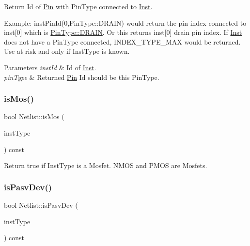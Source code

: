 Return Id of \hyperlink{classPin}{Pin} with Pin\+Type connected to \hyperlink{classInst}{Inst}. 

Example\+: inst\+Pin\+Id(0,\+Pin\+Type\+::\+D\+R\+A\+I\+N) would return the pin index connected to inst\mbox{[}0\mbox{]} which is \hyperlink{type_8h_afaab50027002ecbb6c8ac27e727d1bb4ad22e8f7ce637479aeffe9dab9ee7337d}{Pin\+Type\+::\+D\+R\+A\+IN}. Or this returns inst\mbox{[}0\mbox{]} drain pin index. If \hyperlink{classInst}{Inst} does not have a Pin\+Type connected, I\+N\+D\+E\+X\+\_\+\+T\+Y\+P\+E\+\_\+\+M\+AX would be returned. Use at risk and only if Inst\+Type is known.


\begin{DoxyParams}{Parameters}
{\em inst\+Id} & Id of \hyperlink{classInst}{Inst}. \\
\hline
{\em pin\+Type} & Returned \hyperlink{classPin}{Pin} Id should be this Pin\+Type. \\
\hline
\end{DoxyParams}
\mbox{\label{classNetlist_a3ea34258d9e7f6793736dcac5b927eb6}} 
\subsubsection{\texorpdfstring{is\+Mos()}{isMos()}}
{\footnotesize\ttfamily bool Netlist\+::is\+Mos (\begin{DoxyParamCaption}\item[{\hyperlink{type_8h_a53644c687d6bc203d9d3d3ee70075f61}{Inst\+Type}}]{inst\+Type }\end{DoxyParamCaption}) const}



Return true if Inst\+Type is a Mosfet. N\+M\+OS and P\+M\+OS are Mosfets. 

\mbox{\label{classNetlist_acb347983cc7dcfb9d40c2affe8442cb2}} 
\subsubsection{\texorpdfstring{is\+Pasv\+Dev()}{isPasvDev()}}
{\footnotesize\ttfamily bool Netlist\+::is\+Pasv\+Dev (\begin{DoxyParamCaption}\item[{\hyperlink{type_8h_a53644c687d6bc203d9d3d3ee70075f61}{Inst\+Type}}]{inst\+Type }\end{DoxyParamCaption}) const}



